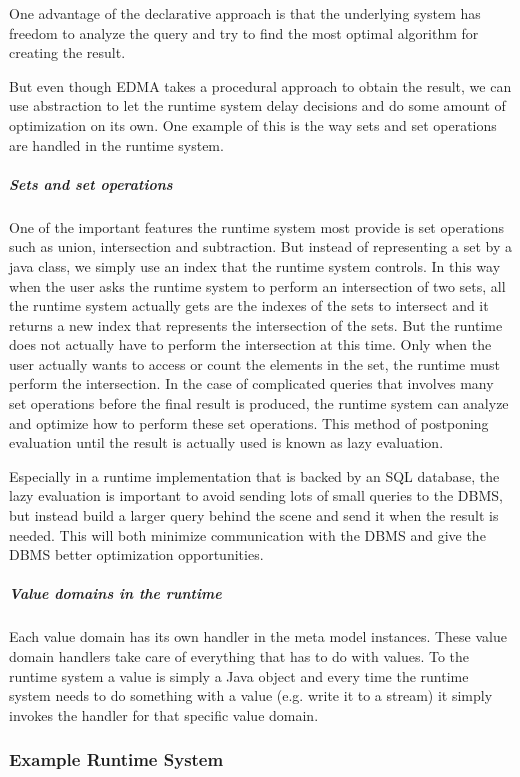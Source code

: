 One advantage of the declarative approach is that the underlying system
has freedom to analyze the query and try to find the most optimal
algorithm for creating the result.

But even though EDMA takes a procedural approach to obtain the result,
we can use abstraction to let the runtime system delay decisions and
do some amount of optimization on its own. One example of this is
the way sets and set operations are handled in the runtime system.


\subparagraph{Sets and set operations}

One of the important features the runtime system most provide is set
operations such as union, intersection and subtraction. But instead
of representing a set by a java class, we simply use an index that
the runtime system controls. In this way when the user asks the runtime
system to perform an intersection of two sets, all the runtime system
actually gets are the indexes of the sets to intersect and it returns
a new index that represents the intersection of the sets. But the
runtime does not actually have to perform the intersection at this
time. Only when the user actually wants to access or count the elements
in the set, the runtime must perform the intersection. In the case
of complicated queries that involves many set operations before the
final result is produced, the runtime system can analyze and optimize
how to perform these set operations. This method of postponing evaluation
until the result is actually used is known as lazy evaluation.

Especially in a runtime implementation that is backed by an SQL database,
the lazy evaluation is important to avoid sending lots of small queries
to the DBMS, but instead build a larger query behind the scene and
send it when the result is needed. This will both minimize communication
with the DBMS and give the DBMS better optimization opportunities.


\subparagraph{Value domains in the runtime}

Each value domain has its own handler in the meta model instances.
These value domain handlers take care of everything that has to do
with values. To the runtime system a value is simply a Java object
and every time the runtime system needs to do something with a value
(e.g. write it to a stream) it simply invokes the handler for that
specific value domain.


\subsubsection{Example Runtime System}

